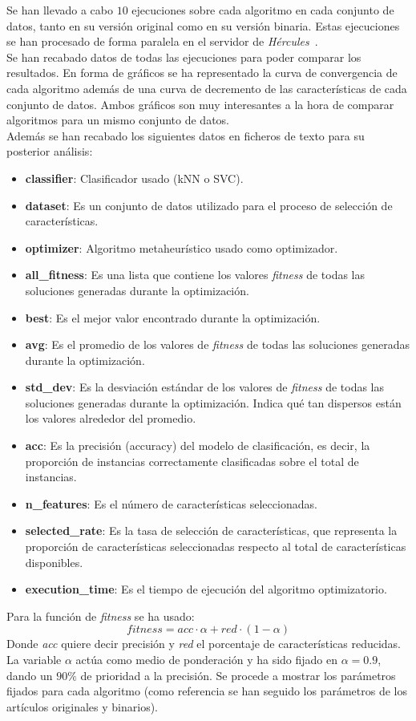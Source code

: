 Se han llevado a cabo $10$ ejecuciones sobre cada algoritmo en cada conjunto de datos, tanto en su versión original como en su versión binaria. Estas ejecuciones se han procesado de forma paralela en el servidor de \textit{Hércules}~\cite{citicugr}.\\[6pt]
Se han recabado datos de todas las ejecuciones para poder comparar los resultados. En forma de gráficos se ha representado la curva de convergencia de cada algoritmo además de una curva de decremento de las características de cada conjunto de datos. Ambos gráficos son muy interesantes a la hora de comparar algoritmos para un mismo conjunto de datos.\\[6pt] 
Además se han recabado los siguientes datos en ficheros de texto para su posterior análisis:
\begin{itemize}
    \item \textbf{classifier}: Clasificador usado (kNN o SVC).
    \item \textbf{dataset}: Es un conjunto de datos utilizado para el proceso de selección de características.
    \item \textbf{optimizer}: Algoritmo metaheurístico usado como optimizador.
    \item \textbf{all\_fitness}: Es una lista que contiene los valores \textit{fitness} de todas las soluciones generadas durante la optimización.
    \item \textbf{best}: Es el mejor valor encontrado durante la optimización.
    \item \textbf{avg}: Es el promedio de los valores de \textit{fitness} de todas las soluciones generadas durante la optimización.
    \item \textbf{std\_dev}: Es la desviación estándar de los valores de \textit{fitness} de todas las soluciones generadas durante la optimización. Indica qué tan dispersos están los valores alrededor del promedio.
    \item \textbf{acc}: Es la precisión (accuracy) del modelo de clasificación, es decir, la proporción de instancias correctamente clasificadas sobre el total de instancias.
    \item \textbf{n\_features}: Es el número de características seleccionadas.
    \item \textbf{selected\_rate}: Es la tasa de selección de características, que representa la proporción de características seleccionadas respecto al total de características disponibles.
    \item \textbf{execution\_time}: Es el tiempo de ejecución del algoritmo optimizatorio.
\end{itemize}
Para la función de \textit{fitness} se ha usado:
\begin{equation}
    fitness = acc\cdot\alpha + red\cdot(1-\alpha)
\end{equation}
Donde \textit{acc} quiere decir precisión y \textit{red} el porcentaje de características reducidas. La variable $\alpha$ actúa como medio de ponderación y ha sido fijado en $\alpha=0.9$, dando un $90\%$ de prioridad a la precisión.
Se procede a mostrar los parámetros fijados para cada algoritmo (como referencia se han seguido los parámetros de los artículos originales y binarios).